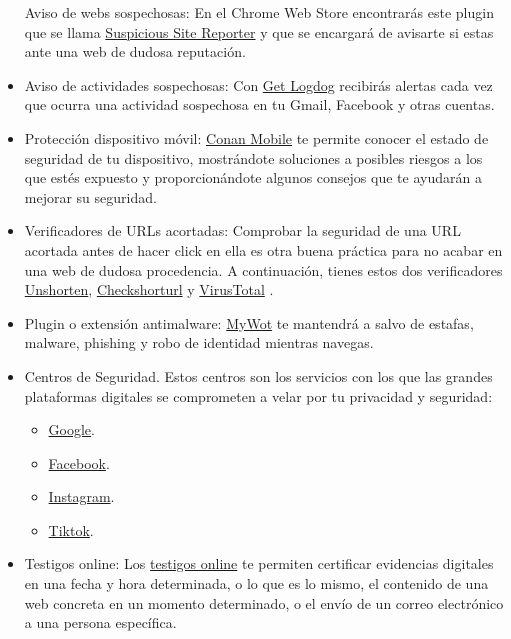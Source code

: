 \documentclass[
  spanish,
  a4paper,
  openany]{book}
\begin{document}
\begin{itemize}
  Aviso de webs sospechosas: En el Chrome Web Store encontrarás este plugin que se llama \href{https://chrome.google.com/webstore/detail/suspicious-site-reporter/jknemblkbdhdcpllfgbfekkdciegfboi}{Suspicious Site Reporter} y que se encargará de avisarte si estas ante una web de dudosa reputación.
\item
  Aviso de actividades sospechosas: Con \href{https://getlogdog.com/}{Get Logdog} recibirás alertas cada vez que ocurra una actividad sospechosa en tu Gmail, Facebook y otras cuentas.
\item
  Protección dispositivo móvil: \href{https://www.osi.es/es/conan-mobile}{Conan Mobile} te permite conocer el estado de seguridad de tu dispositivo, mostrándote soluciones a posibles riesgos a los que estés expuesto y proporcionándote algunos consejos que te ayudarán a mejorar su seguridad.
\item
  Verificadores de URLs acortadas: Comprobar la seguridad de una URL acortada antes de hacer click en ella es otra buena práctica para no acabar en una web de dudosa procedencia. A continuación, tienes estos dos verificadores \href{https://unshorten.it/}{Unshorten}, \href{https://checkshorturl.com/}{Checkshorturl} y \href{https://www.virustotal.com/gui/home/url}{VirusTotal} .
\item
  Plugin o extensión antimalware: \href{https://www.mywot.com/}{MyWot} te mantendrá a salvo de estafas, malware, phishing y robo de identidad mientras navegas.
\item
  Centros de Seguridad. Estos centros son los servicios con los que las grandes plataformas digitales se comprometen a velar por tu privacidad y seguridad:

  \begin{itemize}
  \item
    \href{https://safety.google}{Google}.
  \item
    \href{https://es-es.facebook.com/safety}{Facebook}.
  \item
    \href{https://about.instagram.com/es-la/community/safety}{Instagram}.
  \item
    \href{https://www.tiktok.com/safety?lang=es}{Tiktok}.
  \end{itemize}
\item
  Testigos online: Los \href{https://www.osi.es/es/actualidad/blog/2022/01/26/testigos-online-y-obtencion-de-pruebas-te-explicamos-su-utilidad}{testigos online} te permiten certificar evidencias digitales en una fecha y hora determinada, o lo que es lo mismo, el contenido de una web concreta en un momento determinado, o el envío de un correo electrónico a una persona específica.
\end{itemize}
\end{document}
